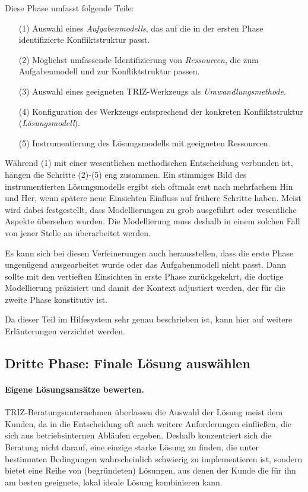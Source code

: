 \documentclass[11pt,a4paper]{article}
\begin{document}
Diese Phase umfasst folgende Teile:
\begin{itemize}[noitemsep]
\item [(1)] Auswahl eines \emph{Aufgabenmodells}, das auf die in der ersten
  Phase identifizierte Konfliktstruktur passt.
\item [(2)] Möglichst umfassende Identifizierung von \emph{Ressourcen}, die
  zum Aufgabenmodell und zur Konfliktstruktur passen.
\item [(3)] Auswahl eines geeigneten TRIZ-Werkzeugs als
  \emph{Umwandlungsmethode}. 
\item [(4)] Konfiguration des Werkzeugs entsprechend der konkreten
  Konfliktstruktur (\emph{Lösungs\-modell}).
\item [(5)] Instrumentierung des Lösungsmodells mit geeigneten Ressourcen.
\end{itemize}
Während (1) mit einer wesentlichen methodischen Entscheidung verbunden ist,
hängen die Schritte (2)-(5) eng zusammen. Ein stimmiges Bild des
instrumentierten Lösungsmodells ergibt sich oftmals erst nach mehrfachem Hin
und Her, wenn spätere neue Einsichten Einfluss auf frühere Schritte haben.
Meist wird dabei festgestellt, dass Modellierungen zu grob ausgeführt oder
wesentliche Aspekte übersehen wurden. Die Modellierung muss deshalb in einem
solchen Fall von jener Stelle an überarbeitet werden.

Es kann sich bei diesen Verfeinerungen auch herausstellen, dass die erste
Phase ungenügend ausgearbeitet wurde oder das Aufgabenmodell nicht passt.
Dann sollte mit den vertieften Einsichten in erste Phase zurückgekehrt, die
dortige Modellierung präzisiert und damit der Kontext adjustiert werden, der
für die zweite Phase konstitutiv ist.

Da dieser Teil im Hilfesystem sehr genau beschrieben ist, kann hier auf
weitere Erläuterungen verzichtet werden.

\subsection{Dritte Phase: Finale Lösung auswählen}

\paragraph{Eigene Lösungsansätze bewerten.}
TRIZ-Beratungsunternehmen überlassen die Auswahl der Lösung meist dem Kunden,
da in die Entscheidung oft auch weitere Anforderungen einfließen, die sich aus
betriebsinternen Abläufen ergeben.  Deshalb konzentriert sich die Beratung
nicht darauf, eine einzige starke Lösung zu finden, die unter bestimmten
Bedingungen wahrscheinlich schwierig zu implementieren ist, sondern bietet
eine Reihe von (begründeten) Lösungen, aus denen der Kunde die für ihn am
besten geeignete, lokal ideale Lösung kombinieren kann.
 
\end{document}

